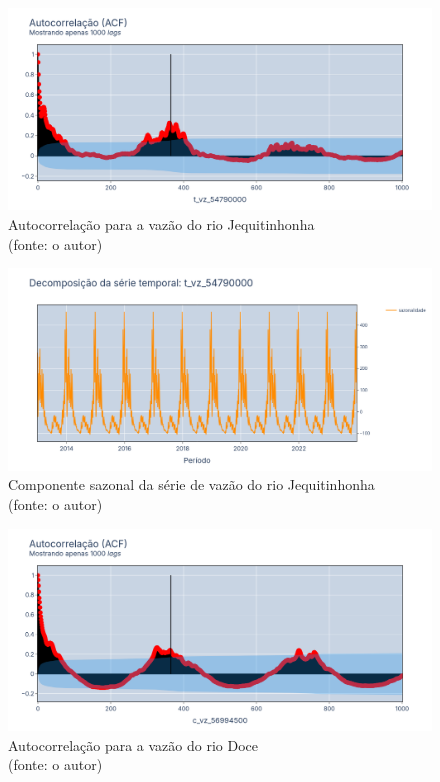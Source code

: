 \begin{figure}[!h]
	\centering
	\includegraphics[scale=0.33]{Figuras/jequiti/acf_jequitinhonha.png}
	\caption{Autocorrelação para a vazão do rio Jequitinhonha\\(fonte: o autor)}
	\label{fig:acf_jequitinhonha}
\end{figure}

\begin{figure}[!h]
	\centering
	\includegraphics[scale=0.33]{Figuras/jequiti/sazonalidade_jequitinhonha.png}
	\caption{Componente sazonal da série de vazão do rio Jequitinhonha\\(fonte: o autor)}
	\label{fig:sazonalidade_jequitinhonha}
\end{figure}

\begin{figure}[!h]
	\centering
	\includegraphics[scale=0.33]{Figuras/rio_doce/acf_rio_doce.png}
	\caption{Autocorrelação para a vazão do rio Doce\\(fonte: o autor)}
	\label{fig:acf_rio_doce}
\end{figure}

